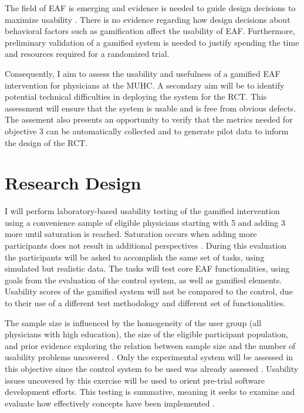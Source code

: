 %
%
The field of \gls{EAF} is emerging and evidence is needed to guide design decisions to maximize usability \cite{brown2016interface}. There is no evidence regarding how design decisions about behavioral factors such as gamification affect the usability of \gls{EAF}. Furthermore, preliminary validation of a gamified system is needed to justify spending the time and resources required for a randomized trial.

Consequently, I aim to assess the usability and usefulness of a gamified \gls{EAF} intervention for physicians at the \gls{MUHC}. A secondary aim will be to identify potential technical difficulties in deploying the system for the \gls{RCT}. This assessment will ensure that the system is usable and is free from obvious defects. The assement  also presents an opportunity to verify that the metrics needed for objective 3 can be automatically collected and to generate pilot data to inform the design of the RCT.

\section{Research Design}
I will perform laboratory-based usability testing of the gamified intervention using a convenience sample of eligible physicians starting with 5 and adding 3 more until saturation is reached. Saturation occurs when adding more participants does not result in additional perspectives \cite{green2018qualitative}. During this evaluation the participants will be asked to accomplish the same set of tasks, using simulated but realistic data. The tasks will test core \gls{EAF} functionalities, using goals from the evaluation of the control system, as well as gamified elements. Usability scores of the gamified system will not be compared to the control, due to their use of a different test methodology and different set of functionalities.

The sample size is influenced by the homogeneity of the user group (all physicians with high education), the size of the eligible participant population, and prior evidence exploring the relation between sample size and the number of usability problems uncovered \cite{nielsen1993mathematical}. Only the experimental system will be assessed in this objective since the control system to be used was already assessed \cite{brown2016interface}. Usability issues uncovered by this exercise will be used to orient pre-trial software development efforts. This testing is  summative, meaning it seeks to examine and evaluate how effectively concepts have been implemented \cite{rubin2008handbook}.

